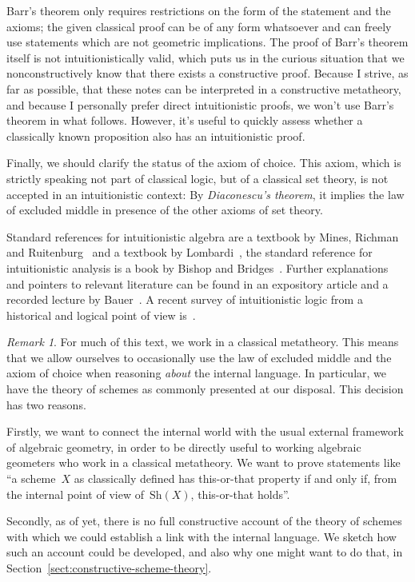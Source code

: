 \documentclass[10pt,reqno,a4paper]{amsbook}
\theoremstyle{definition}
\theoremstyle{plain}
\theoremstyle{remark}
\newtheorem{rem}[defn]{Remark}
\newcommand{\Sh}{\mathrm{Sh}}
\newcommand{\?}{\,{:}\,}
\renewcommand{\_}{\mathpunct{.}\,}
\begin{document}
Barr's theorem only requires restrictions on the form of the statement and the
axioms; the given classical proof can be of any form whatsoever and can freely
use statements which are not geometric implications. The proof of Barr's
theorem itself is not intuitionistically valid, which puts us in the curious
situation that we nonconstructively know that there exists a constructive
proof. Because I strive, as far as possible, that these notes can be
interpreted in a constructive metatheory, and because I personally prefer
direct intuitionistic proofs, we won't use Barr's theorem in what follows.
However, it's useful to quickly assess whether a classically known proposition
also has an intuitionistic proof.

Finally, we should clarify the status of the axiom of choice. This axiom, which
is strictly speaking not part of classical logic, but of a classical set
theory, is not accepted in an intuitionistic context: By \emph{Diaconescu's
theorem}, it implies the law of excluded middle in presence of the other axioms
of set theory.

Standard references for intuitionistic algebra are a textbook by Mines,
Richman and
Ruitenburg~\cite{mines-richman-ruitenburg:constructive-algebra} and a textbook
by Lombardi~\cite{lombardi:quitte:constructive-algebra}, the standard
reference for intuitionistic analysis is a book by Bishop and
Bridges~\cite{bishop-bridges:constructive-analysis}. Further explanations and
pointers to relevant literature can be found in an expository article and a
recorded lecture by Bauer~\cite{bauer:int-mathematics,bauer:video}. A
recent survey of intuitionistic logic from a historical and logical point of
view is~\cite{melikhov:intuitionistic-logic}.

\begin{rem}For much of this text, we work in a classical metatheory. This
means that we allow ourselves to occasionally use the law of excluded middle
and the axiom of choice when reasoning \emph{about} the internal language.
In particular, we have the theory of schemes as commonly presented at our
disposal. This decision has two reasons.

Firstly, we want to connect the internal world with the usual external
framework of algebraic geometry, in order to be directly useful to working
algebraic geometers who work in a classical metatheory. We want to prove
statements like ``a scheme~$X$ as classically defined has this-or-that property
if and only if, from the internal point of view of~$\Sh(X)$, this-or-that
holds''.

Secondly, as of yet, there is no full constructive account of the theory of
schemes with which we could establish a link with the internal language. We
sketch how such an account could be developed, and also why one might want to
do that, in Section~\ref{sect:constructive-scheme-theory}.\end{rem}
\end{document}
